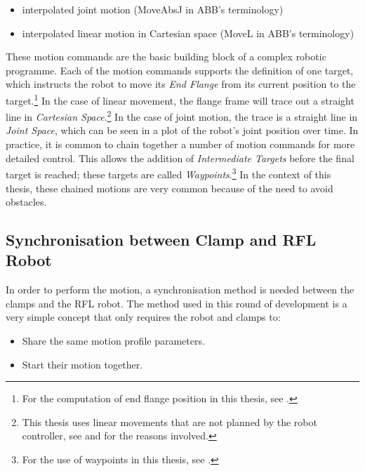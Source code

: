 \begin{itemize}[nosep]
    \item interpolated joint motion (MoveAbsJ in ABB’s terminology)
    \item interpolated linear motion in Cartesian space (MoveL in ABB’s terminology)
\end{itemize}

These motion commands are the basic building block of a complex robotic programme. Each of the motion commands supports the definition of one target, which instructs the robot to move its \textit{End Flange} from its current position to the target.\footnote{For the computation of end flange position in this thesis, see .} 
In the case of linear movement, the flange frame will trace out a straight line in \textit{Cartesian Space}.\footnote{This thesis uses linear movements that are not planned by the robot controller, see  and  for the reasons involved.}
In the case of joint motion, the trace is a straight line in \textit{Joint Space}, which can be seen in a plot of the robot's joint position over time.
In practice, it is common to chain together a number of motion commands for more detailed control. This allows the addition of \textit{Intermediate Targets} before the final target is reached; these targets are called \textit{Waypoints}.\footnote{For the use of waypoints in this thesis, see .} In the context of this thesis, these chained motions are very common because of the need to avoid obstacles.

\subsection{Synchronisation between Clamp and RFL Robot}
\label{subsection:exploration-2-synchronisation-between-clamp-and-rfl-robot}

In order to perform the  motion, a synchronisation method is needed between the clamps and the RFL robot. The method used in this round of development is a very simple concept that only requires the robot and clamps to:

\begin{itemize}[nosep]
    \item Share the same motion profile parameters.
    \item Start their motion together.
\end{itemize}

